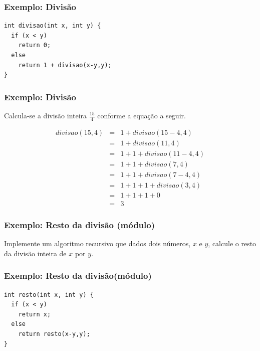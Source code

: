 \documentclass[aspectratio=169]{beamer}
\begin{document}
\begin{frame}[fragile]
\frametitle{Exemplo: Divisão}
\begin{lstlisting}
int divisao(int x, int y) {
  if (x < y)
    return 0;  
  else 
    return 1 + divisao(x-y,y);
}
\end{lstlisting}
\end{frame}


\begin{frame}[fragile]
\frametitle{Exemplo: Divisão}
Calcula-se a divisão inteira  $\frac{15}{4}$ conforme a equação a seguir.

\begin{eqnarray}
  divisao(15,4)&=& 1 + divisao(15-4,4) \nonumber \\
                &=& 1 + divisao(11,4) \nonumber \\
	        &=& 1 + 1 + divisao(11-4,4) \nonumber \\
	        &=& 1 + 1 + divisao(7,4) \nonumber \\
	        &=& 1 + 1 + divisao(7-4,4) \nonumber \\
	        &=& 1 + 1 + 1 + divisao(3,4) \nonumber \\
	        &=& 1 + 1 + 1 + 0 \nonumber \\
	        &=& 3\nonumber
\end{eqnarray}
\end{frame}


\begin{frame}
\frametitle{Exemplo: Resto da divisão (módulo)}
Implemente um algoritmo recursivo que dados dois números, $x$ e $y$, calcule o resto da divisão inteira de $x$ por $y$.
\end{frame}


\begin{frame}[fragile]
\frametitle{Exemplo: Resto da divisão(módulo)}
\begin{lstlisting}
int resto(int x, int y) {
  if (x < y)
    return x;  
  else 
    return resto(x-y,y);
}
\end{lstlisting}
\end{frame}

\end{document}
